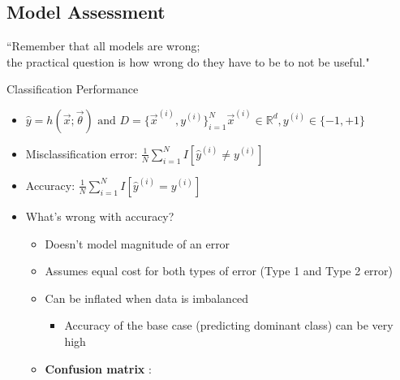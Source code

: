 \documentclass[10pt, oneside]{article}
\newcommand{\R}{\mathbb{R}}
\begin{document}
\subsection{Model Assessment}
\begin{center}
    ``Remember that all models are wrong; \\the practical question is how wrong do they have to be to not be useful."
\end{center}
Classification Performance
\begin{itemize}
    \item $\hat y = h(\vec x;\vec \theta) \text{ and }D= \{\vec x^{(i)}, y^{(i)}\}_{i=1}^N \vec x^{(i)} \in \R^d, y^{(i)} \in \{-1, +1\}$
    \item Misclassification error: $\frac{1}{N} \sum_{i=1} ^N I[\hat y^{(i)} \neq y^{(i)}]$
    \item Accuracy: $\frac{1}{N} \sum_{i=1} ^N I[\hat y^{(i)} =y^{(i)}]$
    \item What's wrong with accuracy?
    \begin{itemize}
        \item Doesn't model magnitude of an error
        \item Assumes equal cost for both types of error (Type 1 and Type 2 error)
        \item Can be inflated when data is imbalanced
        \begin{itemize}
            \item Accuracy of the base case (predicting dominant class) can be very high
        \end{itemize}
        \item \textbf{Confusion matrix }:
        

\end{itemize}
\end{itemize}
\end{document}

